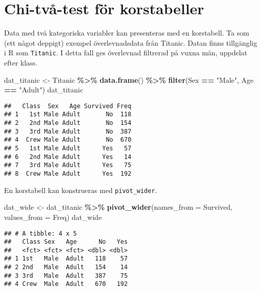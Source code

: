\documentclass[
]{book}
\newenvironment{Shaded}{\begin{snugshade}}{\end{snugshade}}
\newcommand{\AttributeTok}[1]{\textcolor[rgb]{0.13,0.29,0.53}{#1}}
\newcommand{\FunctionTok}[1]{\textcolor[rgb]{0.13,0.29,0.53}{\textbf{#1}}}
\newcommand{\NormalTok}[1]{#1}
\newcommand{\OtherTok}[1]{\textcolor[rgb]{0.56,0.35,0.01}{#1}}
\newcommand{\SpecialCharTok}[1]{\textcolor[rgb]{0.81,0.36,0.00}{\textbf{#1}}}
\newcommand{\StringTok}[1]{\textcolor[rgb]{0.31,0.60,0.02}{#1}}
\theoremstyle{definition}
\theoremstyle{definition}
\theoremstyle{definition}
\theoremstyle{definition}
\theoremstyle{remark}
\begin{document}
\hypertarget{chi-tvuxe5-test-fuxf6r-korstabeller}{%
\section{Chi-två-test för korstabeller}\label{chi-tvuxe5-test-fuxf6r-korstabeller}}

Data med två kategoriska variabler kan presenteras med en korstabell. Ta som (ett något deppigt) exempel överlevnadsdata från Titanic. Datan finns tillgänglig i R som \texttt{Titanic}. I detta fall ges överlevnad filtrerad på vuxna män, uppdelat efter klass.

\begin{Shaded}
\begin{Highlighting}[]
\NormalTok{dat\_titanic }\OtherTok{\textless{}{-}}\NormalTok{ Titanic }\SpecialCharTok{\%\textgreater{}\%} \FunctionTok{data.frame}\NormalTok{() }\SpecialCharTok{\%\textgreater{}\%} \FunctionTok{filter}\NormalTok{(Sex }\SpecialCharTok{==} \StringTok{"Male"}\NormalTok{, Age }\SpecialCharTok{==} \StringTok{"Adult"}\NormalTok{)}
\NormalTok{dat\_titanic}
\end{Highlighting}
\end{Shaded}

\begin{verbatim}
##   Class  Sex   Age Survived Freq
## 1   1st Male Adult       No  118
## 2   2nd Male Adult       No  154
## 3   3rd Male Adult       No  387
## 4  Crew Male Adult       No  670
## 5   1st Male Adult      Yes   57
## 6   2nd Male Adult      Yes   14
## 7   3rd Male Adult      Yes   75
## 8  Crew Male Adult      Yes  192
\end{verbatim}

En korstabell kan konstrueras med \texttt{pivot\_wider}.

\begin{Shaded}
\begin{Highlighting}[]
\NormalTok{dat\_wide }\OtherTok{\textless{}{-}}\NormalTok{ dat\_titanic }\SpecialCharTok{\%\textgreater{}\%} 
  \FunctionTok{pivot\_wider}\NormalTok{(}\AttributeTok{names\_from =}\NormalTok{ Survived, }\AttributeTok{values\_from =}\NormalTok{ Freq)}
\NormalTok{dat\_wide}
\end{Highlighting}
\end{Shaded}

\begin{verbatim}
## # A tibble: 4 x 5
##   Class Sex   Age      No   Yes
##   <fct> <fct> <fct> <dbl> <dbl>
## 1 1st   Male  Adult   118    57
## 2 2nd   Male  Adult   154    14
## 3 3rd   Male  Adult   387    75
## 4 Crew  Male  Adult   670   192
\end{verbatim}
\end{document}
